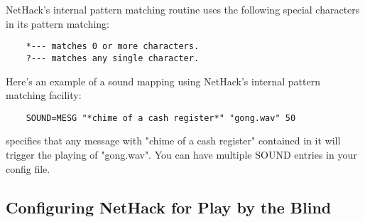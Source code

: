 NetHack's internal pattern matching routine uses the following
special characters in its pattern matching:

\begin{verbatim}
    *--- matches 0 or more characters.
    ?--- matches any single character.
\end{verbatim}

Here's an example of a sound mapping using NetHack's internal
pattern matching facility:
\begin{verbatim}
    SOUND=MESG "*chime of a cash register*" "gong.wav" 50
\end{verbatim}
specifies that any message with "chime of a cash register" contained
in it will trigger the playing of "gong.wav".  You can have multiple
SOUND entries in your config file.

\subsection*{Configuring NetHack for Play by the Blind}

